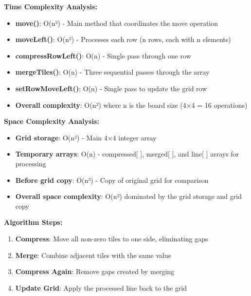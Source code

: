 \documentclass[12pt, a4paper]{article}
\begin{document}
\textbf{Time Complexity Analysis:}
\begin{itemize}
    \item \textbf{move()}: O(n²) - Main method that coordinates the move operation
    \item \textbf{moveLeft()}: O(n²) - Processes each row (n rows, each with n elements)
    \item \textbf{compressRowLeft()}: O(n) - Single pass through one row
    \item \textbf{mergeTiles()}: O(n) - Three sequential passes through the array
    \item \textbf{setRowMoveLeft()}: O(n) - Single pass to update the grid row
    \item \textbf{Overall complexity}: O(n²) where n is the board size (4×4 = 16 operations)
\end{itemize}

\textbf{Space Complexity Analysis:}
\begin{itemize}
    \item \textbf{Grid storage}: O(n²) - Main 4×4 integer array
    \item \textbf{Temporary arrays}: O(n) - compressed[ ], merged[ ], and line[ ] arrays for processing
    \item \textbf{Before grid copy}: O(n²) - Copy of original grid for comparison
    \item \textbf{Overall space complexity}: O(n²) dominated by the grid storage and grid copy
\end{itemize}

\textbf{Algorithm Steps:}
\begin{enumerate}
    \item \textbf{Compress}: Move all non-zero tiles to one side, eliminating gaps
    \item \textbf{Merge}: Combine adjacent tiles with the same value
    \item \textbf{Compress Again}: Remove gaps created by merging
    \item \textbf{Update Grid}: Apply the processed line back to the grid
\end{enumerate}
\end{document}
